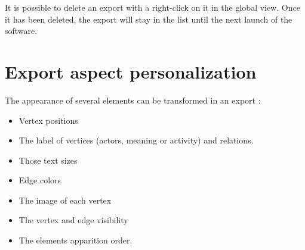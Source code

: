 It is possible to delete an export with a right-click on it in the global view. Once it has been deleted, the export will stay in the list until the next launch of the software.\\

\section{Export aspect personalization}

The appearance of several elements can be transformed in an export :
\begin{itemize}
\item Vertex positions
\item The label of vertices (actors, meaning or activity) and relations.
\item Those text sizes
\item Edge colors
\item The image of each vertex
\item The vertex and edge visibility
\item The elements apparition order.
\end{itemize}
